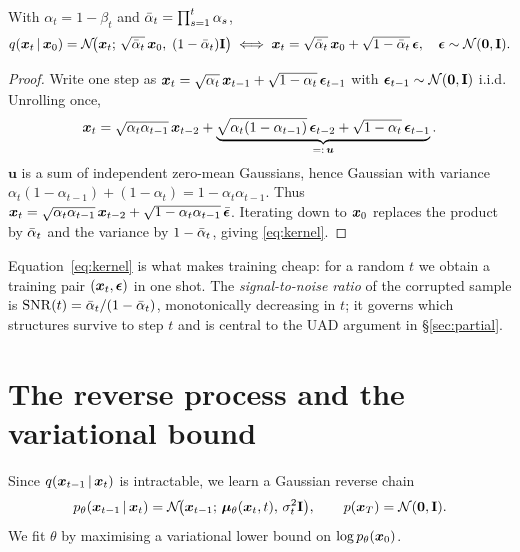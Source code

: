 \begin{proposition}
With $\alpha_t=1-\beta_t$ and $\bar{\alpha}_t=\prod_{s=1}^t \alpha_s$,
\begin{equation}
q(\bm{x}_t\,\vert\,\bm{x}_0)=\mathcal{N}\!\big(\bm{x}_t;\,\sqrt{\bar{\alpha}_t}\,\bm{x}_0,\;(1-\bar{\alpha}_t)\mathbf{I}\big)
\;\Longleftrightarrow\;
\bm{x}_t=\sqrt{\bar{\alpha}_t}\,\bm{x}_0+\sqrt{1-\bar{\alpha}_t}\,\bm{\epsilon},\quad \bm{\epsilon}\sim\mathcal{N}(\bm0,\mathbf{I}).
\label{eq:kernel}
\end{equation}
\end{proposition}
\begin{proof}
Write one step as $\bm{x}_t=\sqrt{\alpha_t}\,\bm{x}_{t-1}+\sqrt{1-\alpha_t}\,\bm{\epsilon}_{t-1}$ with
$\bm{\epsilon}_{t-1}\sim\mathcal{N}(\bm0,\mathbf{I})$ i.i.d. Unrolling once,
\[
\bm{x}_t=\sqrt{\alpha_t\alpha_{t-1}}\,\bm{x}_{t-2}
+\underbrace{\sqrt{\alpha_t(1-\alpha_{t-1})}\,\bm{\epsilon}_{t-2}+\sqrt{1-\alpha_t}\,\bm{\epsilon}_{t-1}}_{=: \,\bm u}.
\]
$\bm u$ is a sum of independent zero-mean Gaussians, hence Gaussian with variance
$\alpha_t(1-\alpha_{t-1})+(1-\alpha_t)=1-\alpha_t\alpha_{t-1}$. Thus
$\bm{x}_t=\sqrt{\alpha_t\alpha_{t-1}}\,\bm{x}_{t-2}+\sqrt{1-\alpha_t\alpha_{t-1}}\,\bar{\bm{\epsilon}}$.
Iterating down to $\bm{x}_0$ replaces the product by $\bar{\alpha}_t$ and the variance by
$1-\bar{\alpha}_t$, giving \eqref{eq:kernel}.
\end{proof}

\noindent Equation~\eqref{eq:kernel} is what makes training cheap: for a random
$t$ we obtain a training pair $(\bm{x}_t,\bm{\epsilon})$ in one shot. The
\emph{signal-to-noise ratio} of the corrupted sample is
$\mathrm{SNR}(t)=\bar{\alpha}_t/(1-\bar{\alpha}_t)$, monotonically decreasing in $t$; it
governs which structures survive to step $t$ and is central to the UAD argument
in \S\ref{sec:partial}.

\section{The reverse process and the variational bound}
Since $q(\bm{x}_{t-1}\,\vert\,\bm{x}_t)$ is intractable, we learn a Gaussian reverse chain
\begin{equation}
p_\theta(\bm{x}_{t-1}\,\vert\,\bm{x}_t)=\mathcal{N}\!\big(\bm{x}_{t-1};\,\bm\mu_\theta(\bm{x}_t,t),\,\sigma_t^2\mathbf{I}\big),
\qquad p(\bm{x}_T)=\mathcal{N}(\bm0,\mathbf{I}).
\label{eq:rev}
\end{equation}
We fit $\theta$ by maximising a variational lower bound on $\log p_\theta(\bm{x}_0)$.

